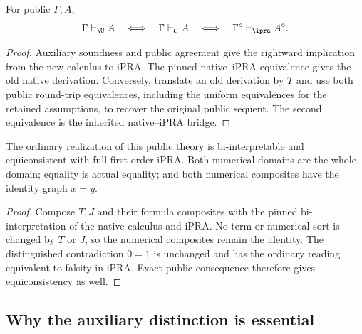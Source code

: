 \begin{theorem}\label{thm:exact-public}
For public $\Gamma,A$,
\[
 \Gamma\vdash_{\U}A
 \quad\Longleftrightarrow\quad
 \Gamma\vdash_{\mathcal C}A
 \quad\Longleftrightarrow\quad
 \Gamma^\circ\vdash_{\ipra}A^\circ.
\]
\end{theorem}
\begin{proof}
Auxiliary soundness and public agreement give the rightward implication
from the new calculus to iPRA.  The pinned native--iPRA equivalence gives
the old native derivation.  Conversely, translate an old derivation by
$T$ and use both public round-trip equivalences, including the uniform
equivalences for the retained assumptions, to recover the original public
sequent.  The second equivalence is the inherited native--iPRA bridge.
\end{proof}

\begin{corollary}
The ordinary realization of this public theory is bi-interpretable and
equiconsistent with full first-order iPRA.  Both numerical domains are the
whole domain; equality is actual equality; and both numerical composites
have the identity graph $x=y$.
\end{corollary}
\begin{proof}
Compose $T,J$ and their formula composites with the pinned
bi-interpretation of the native calculus and iPRA.  No term or numerical
sort is changed by $T$ or $J$, so the numerical composites remain the
identity.  The distinguished contradiction $0=1$ is unchanged and has
the ordinary reading equivalent to falsity in iPRA.  Exact public
consequence therefore gives equiconsistency as well.
\end{proof}

\subsection{Why the auxiliary distinction is essential}

